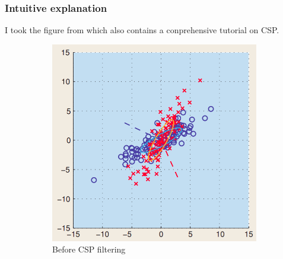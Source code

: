 \subsubsection{Intuitive explanation}


I took the figure from \cite{blankertz2007optimizing} which also contains a conprehensive tutorial on CSP.

\begin{figure}
    \centering
    \begin{subfigure}{.5\textwidth}
        \centering
        \includegraphics[width=1.\linewidth]{images_report/sensor/before_csp_filtering.png}
        \caption{Before CSP filtering}
        \label{fig:before_csp}
    \end{subfigure}%
    \begin{subfigure}{.5\textwidth}
        \centering

\end{subfigure}
\end{figure}
